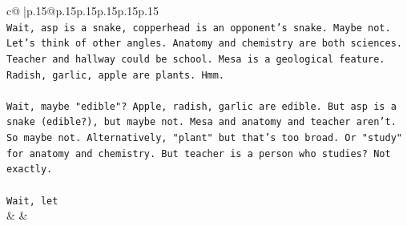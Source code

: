 \documentclass{article}
\begin{document}
{\begin{supertabular}{c@{$\;$}|p{.15\linewidth}@{}p{.15\linewidth}p{.15\linewidth}p{.15\linewidth}p{.15\linewidth}p{.15\linewidth}}
{{{\\ 
\texttt{Wait, asp is a snake, copperhead is an opponent's snake. Maybe not. Let's think of other angles. Anatomy and chemistry are both sciences. Teacher and hallway could be school. Mesa is a geological feature. Radish, garlic, apple are plants. Hmm.} \\
\\ 
\texttt{Wait, maybe "edible"? Apple, radish, garlic are edible. But asp is a snake (edible?), but maybe not. Mesa and anatomy and teacher aren't. So maybe not. Alternatively, "plant" but that's too broad. Or "study" for anatomy and chemistry. But teacher is a person who studies? Not exactly.} \\
\\ 
\texttt{Wait, let} \\
            }
        }
    }
    & & \\ \\


\end{supertabular}}
\end{document}
